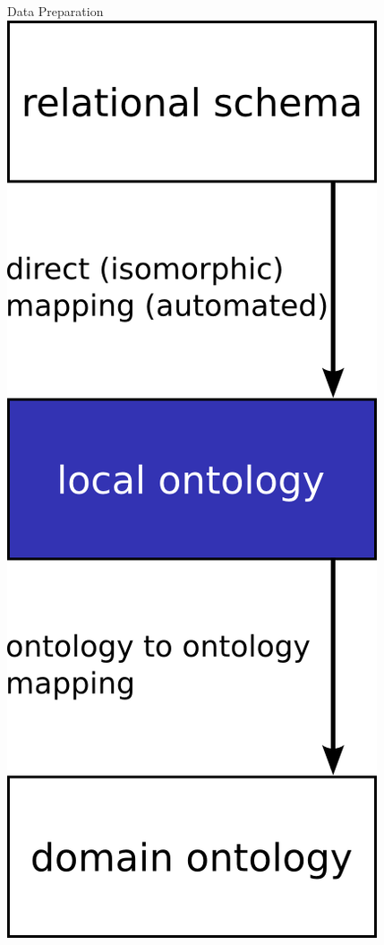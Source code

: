 \documentclass{beamer}
\begin{document}
\begin{frame}{Data Preparation}
\includegraphics[width=\textwidth,height=.88\textheight,keepaspectratio]{g2}
\end{frame}
\end{document}
